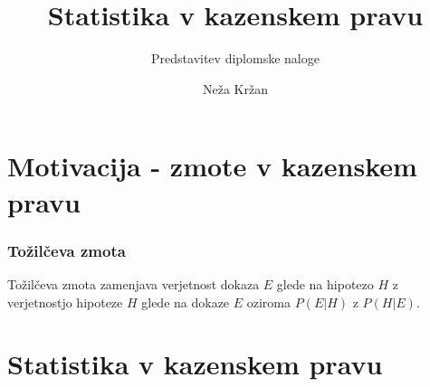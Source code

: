 \documentclass{beamer}
\begin{document}
\title{Statistika v kazenskem pravu}
\subtitle{Predstavitev diplomske naloge}
\author[Neža Kržan]{Neža Kržan}
 
\date[7. september 2023] {}

\subject{Talks}

\begin{frame}
   \titlepage
\end{frame}

\section{Motivacija - zmote v kazenskem pravu}

\begin{frame}
   \frametitle{Tožilčeva zmota}
   \begin{block}{Tožilčeva zmota}
      zamenjava verjetnost dokaza $E$ glede na hipotezo $H$ z verjetnostjo hipoteze $H$ glede na dokaze $E$ oziroma $P(E \lvert H)$ z $P(H \lvert E)$.
   \end{block} \vspace{2mm}
  
\end{frame}

\section{Statistika v kazenskem pravu}
\end{document}
